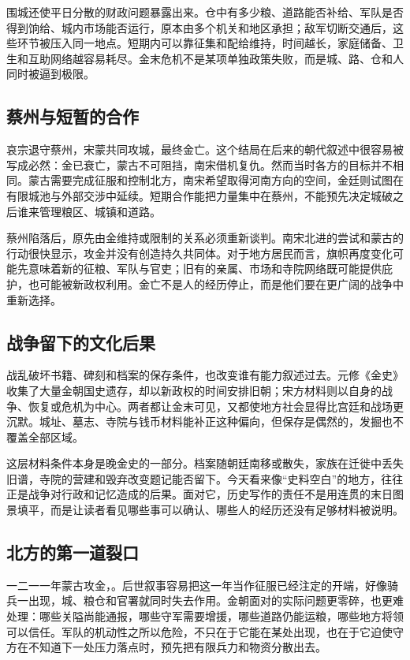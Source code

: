 围城还使平日分散的财政问题暴露出来。仓中有多少粮、道路能否补给、军队是否得到饷给、城内市场能否运行，原本由多个机关和地区承担；敌军切断交通后，这些环节被压入同一地点。短期内可以靠征集和配给维持，时间越长，家庭储备、卫生和互助网络越容易耗尽。金末危机不是某项单独政策失败，而是城、路、仓和人同时被逼到极限。

\subsection{蔡州与短暂的合作}

哀宗退守蔡州，宋蒙共同攻城，最终金亡。这个结局在后来的朝代叙述中很容易被写成必然：金已衰亡，蒙古不可阻挡，南宋借机复仇。然而当时各方的目标并不相同。蒙古需要完成征服和控制北方，南宋希望取得河南方向的空间，金廷则试图在有限城池与外部交涉中延续。短期合作能把力量集中在蔡州，不能预先决定城破之后谁来管理粮区、城镇和道路。

蔡州陷落后，原先由金维持或限制的关系必须重新谈判。南宋北进的尝试和蒙古的行动很快显示，攻金并没有创造持久共同体。对于地方居民而言，旗帜再度变化可能先意味着新的征粮、军队与官吏；旧有的亲属、市场和寺院网络既可能提供庇护，也可能被新政权利用。金亡不是人的经历停止，而是他们要在更广阔的战争中重新选择。

\subsection{战争留下的文化后果}

战乱破坏书籍、碑刻和档案的保存条件，也改变谁有能力叙述过去。元修《金史》收集了大量金朝国史遗存，却以新政权的时间安排旧朝；宋方材料则以自身的战争、恢复或危机为中心。两者都让金末可见，又都使地方社会显得比宫廷和战场更沉默。城址、墓志、寺院与钱币材料能补正这种偏向，但保存是偶然的，发掘也不覆盖全部区域。

这层材料条件本身是晚金史的一部分。档案随朝廷南移或散失，家族在迁徙中丢失旧谱，寺院的营建和毁弃改变题记能否留下。今天看来像“史料空白”的地方，往往正是战争对行政和记忆造成的后果。面对它，历史写作的责任不是用连贯的末日图景填平，而是让读者看见哪些事可以确认、哪些人的经历还没有足够材料被说明。

\subsection{北方的第一道裂口}

一二一一年蒙古攻金，。后世叙事容易把这一年当作征服已经注定的开端，好像骑兵一出现，城、粮仓和官署就同时失去作用。金朝面对的实际问题更零碎，也更难处理：哪些关隘尚能通报，哪些守军需要增援，哪些道路仍能运粮，哪些地方将领可以信任。军队的机动性之所以危险，不只在于它能在某处出现，也在于它迫使守方在不知道下一处压力落点时，预先把有限兵力和物资分散出去。

